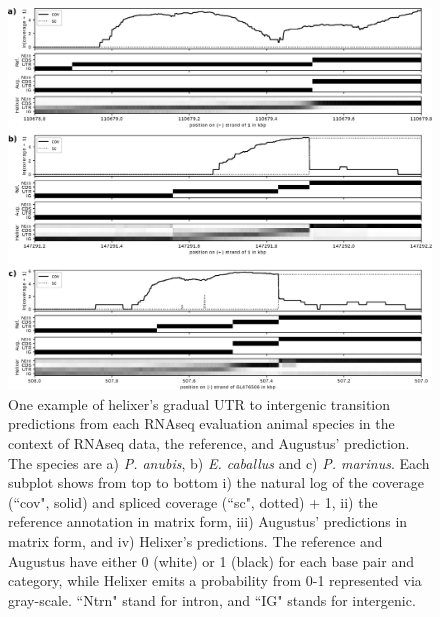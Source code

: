 \documentclass{article}
\begin{document}
\begin{figure}[!h]
\renewcommand\thefigure{S10}
\centerline{\includegraphics[width=17.8cm]{images/cov_examples/cov_example_UTRs_animals}}
\caption{
One example of helixer's gradual UTR to intergenic transition predictions 
from each RNAseq evaluation animal species in the context of RNAseq data, the reference,
and Augustus' prediction. The species are
a) {\it P. anubis}, b) {\it E. caballus} and c) {\it P. marinus}. Each subplot shows from top to
bottom i) the natural log of the coverage (``cov", solid) and spliced coverage
(``sc", dotted) + 1, ii) the reference annotation in matrix form, iii)
Augustus' predictions in matrix form, and iv) Helixer's predictions. The reference
and Augustus have either 0 (white) or 1 (black) for each base pair and category, while
Helixer emits a probability from 0-1 represented via gray-scale. ``Ntrn" stand
for intron, and ``IG" stands for intergenic.
}
\end{figure}
\end{document}
